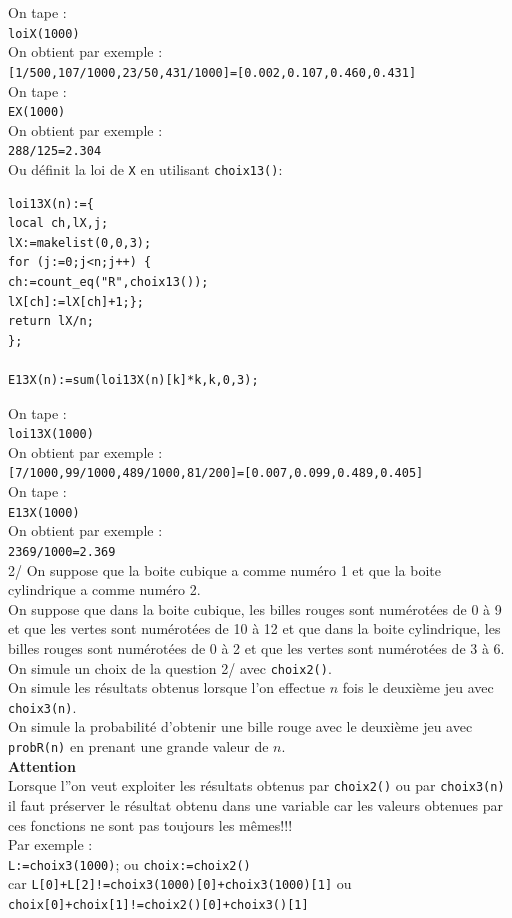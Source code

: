\documentclass[a4paper,11pt]{book}
\begin{document}
On tape :\\
{\tt loiX(1000)}\\
On obtient par exemple :\\
{\tt [1/500,107/1000,23/50,431/1000]=[0.002,0.107,0.460,0.431]}\\
On tape :\\
{\tt EX(1000)}\\
On obtient par exemple :\\
{\tt 288/125=2.304}\\
Ou d\'efinit la loi de {\tt X} en utilisant {\tt choix13()}:
\begin{verbatim}
loi13X(n):={
local ch,lX,j;
lX:=makelist(0,0,3);
for (j:=0;j<n;j++) {
ch:=count_eq("R",choix13());
lX[ch]:=lX[ch]+1;};
return lX/n;
};

E13X(n):=sum(loi13X(n)[k]*k,k,0,3);
\end{verbatim}
On tape :\\
{\tt loi13X(1000)}\\
On obtient par exemple :\\
{\tt [7/1000,99/1000,489/1000,81/200]=[0.007,0.099,0.489,0.405]}\\
On tape :\\
{\tt E13X(1000)}\\
On obtient par exemple :\\
{\tt 2369/1000=2.369}\\
2/ On suppose que la boite cubique a comme num\'ero 1 et que la boite 
cylindrique a comme num\'ero 2.\\ 
On suppose que dans la boite cubique, les billes rouges sont num\'erot\'ees 
de 0 \`a 9 et que les vertes sont num\'erot\'ees de 10 \`a 12 et que dans la 
boite cylindrique, les billes rouges sont num\'erot\'ees 
de 0 \`a 2 et que les vertes sont num\'erot\'ees de 3 \`a 6.\\
On simule un choix de la question 2/ avec {\tt choix2()}.\\
On simule les r\'esultats obtenus lorsque l'on effectue $n$ fois le deuxi\`eme 
jeu avec {\tt choix3(n)}.\\
On simule la probabilit\'e d'obtenir une bille rouge avec le deuxi\`eme 
jeu  avec {\tt probR(n)} en prenant une grande valeur de $n$.\\
{\bf Attention}\\
Lorsque l''on veut exploiter les r\'esultats obtenus par {\tt choix2()} ou par 
{\tt choix3(n)} il faut pr\'eserver le r\'esultat obtenu dans une variable car 
les valeurs obtenues par ces fonctions ne sont pas toujours les m\^emes!!!\\
Par exemple :\\
{\tt L:=choix3(1000)}; ou {\tt choix:=choix2()}\\
car {\tt L[0]+L[2]!=choix3(1000)[0]+choix3(1000)[1]} ou\\
{\tt choix[0]+choix[1]!=choix2()[0]+choix3()[1]}\\
\end{document}

